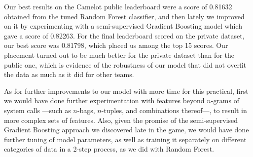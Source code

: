 \documentclass[11pt]{article}
\begin{document}
Our best results on the Camelot public leaderboard were a score of 0.81632 obtained from the tuned Random Forest classifier, and then lately we improved on it by experimenting with a semi-supervised Gradient Boosting model which gave a score of 0.82263. For the final leaderboard scored on the private dataset, our best score was 0.81798, which placed us among the top 15 scores. Our placement turned out to be much better for the private dataset than for the public one, which is evidence of the robustness of our model that did not overfit the data as much as it did for other teams.

As for further improvements to our model with more time for this practical, first we would have done further experimentation with features beyond $n$-grams of system calls ---such as $n$-bags, $n$-tuples, and combinations thereof---, to result in more complex sets of features. Also, given the promise of the semi-supervised Gradient Boosting approach we discovered late in the game, we would have done further tuning of model parameters, as well as training it separately on different categories of data in a 2-step process, as we did with Random Forest.

\newpage
\nocite{rozenberg}


\end{document}
